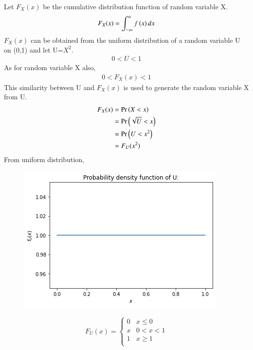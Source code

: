 \documentclass[journal,12pt,twocolumn]{IEEEtran}
\begin{document}
Let $F_X(x)$ be the cumulative distribution function of random variable X.
\begin{align}
    F_X(x)=\int_{-\infty}^x f\left(x\right) dx\label{x}
\end{align}
$F_X(x)$ can be obtained from the uniform distribution of a random variable U on (0,1) and let U=$X^2$. 
\begin{align}
    0 < U < 1
\end{align}
As for random variable X also,
\begin{align}
    0 < F_X(x) < 1
\end{align}
This similarity between U and $F_X(x)$ is used to generate the random variable X from U.
\begin{align}
    F_X(x)&= \Pr\left(X<x\right)\\
    &=\Pr\left(\sqrt{U}<x\right)\\
    &=\Pr\left(U<x^2\right)\\
    &=F_U(x^2)\label{y}
\end{align}
From uniform distribution,
\begin{figure}[htp]
    \centering
    \includegraphics[width=\columnwidth]{assign2_2.png}
\end{figure}
\begin{align}
    F_U(x)=
    \begin{cases}
0 & x\leq0\\
x & 0<x<1
\\
1 & x\geq1\label{z}\\
\end{cases}
\end{align}
\end{document}
